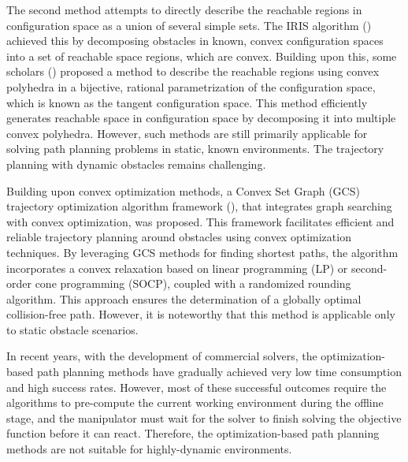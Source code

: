 The second method attempts to directly describe the reachable regions in configuration space as a union of several simple sets. The IRIS algorithm (\cite{2015_STAR_Computing_Large_Convex_Regions}) achieved this by decomposing obstacles in known, convex configuration spaces into a set of reachable space regions, which are convex. Building upon this, some scholars (\cite{2023_IJRR_Certified_polyhedral_decompositions}) proposed a method to describe the reachable regions using convex polyhedra in a bijective, rational parametrization of the configuration space, which is known as the tangent configuration space. This method efficiently generates reachable space in configuration space by decomposing it into multiple convex polyhedra. However, such methods are still primarily applicable for solving path planning problems in static, known environments. The trajectory planning with dynamic obstacles remains challenging.

Building upon convex optimization methods, a Convex Set Graph (GCS) trajectory optimization algorithm framework (\cite{2023_SR_Motion_planning_around_obstacles_with_convex_optimization}), that integrates graph searching with convex optimization, was proposed. This framework facilitates efficient and reliable trajectory planning around obstacles using convex optimization techniques. By leveraging GCS methods for finding shortest paths, the algorithm incorporates a convex relaxation based on linear programming (LP) or second-order cone programming (SOCP), coupled with a randomized rounding algorithm. This approach ensures the determination of a globally optimal collision-free path. However, it is noteworthy that this method is applicable only to static obstacle scenarios.

In recent years, with the development of commercial solvers, the optimization-based path planning methods have gradually achieved very low time consumption and high success rates. However, most of these successful outcomes require the algorithms to pre-compute the current working environment during the offline stage, and the manipulator must wait for the solver to finish solving the objective function before it can react. Therefore, the optimization-based path planning methods are not suitable for highly-dynamic environments.


